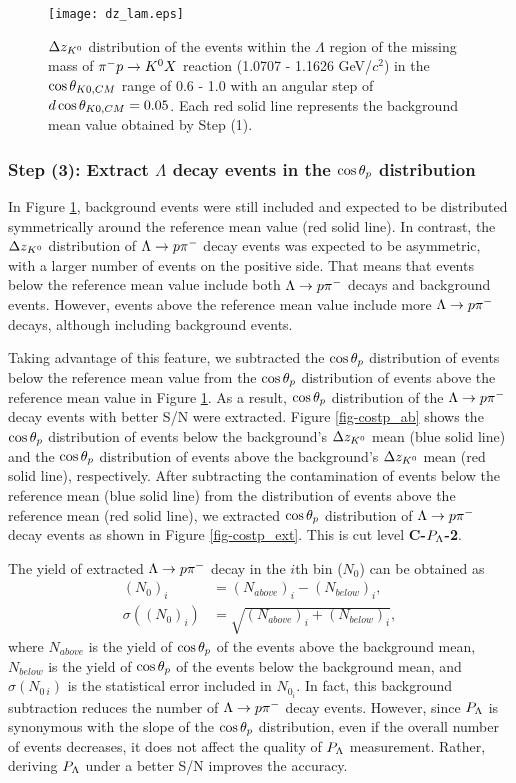 \begin{figure}[h]
  \centering
  \texttt{[image: dz\_lam.eps]}
  \caption{$\Delta z_{K^{0}}$ distribution of the events within the $\Lambda$ region of the missing mass of $\pi^- p \to K^0 X$ reaction (1.0707 - 1.1626 GeV/$c^{2}$) in the $\cos{\theta_{K0,CM}}$ range of 0.6 - 1.0 with an angular step of $d\cos{\theta_{K0,CM}}=0.05$. Each red solid line represents the background mean value obtained by Step (1).}
  \label{fig-dz_lam}
\end{figure}


\subsubsection{Step (3): Extract $\Lambda$ decay events in the $\cos{\theta_p}$ distribution}
\label{subsubsec-extcostp}

In Figure \ref{fig-dz_lam}, background events were still included and expected to be distributed symmetrically around the reference mean value (red solid line). In contrast, the $\Delta z_{K^{0}}$ distribution of $\Lambda\to p\pi^{-}$ decay events was expected to be asymmetric, with a larger number of events on the positive side. That means that events below the reference mean value include both $\Lambda\to p\pi^{-}$ decays and background events. However, events above the reference mean value include more $\Lambda\to p\pi^{-}$ decays, although including background events.

Taking advantage of this feature, we subtracted the $\cos{\theta_p}$ distribution of events below the reference mean value from the $\cos{\theta_p}$ distribution of events above the reference mean value in Figure \ref{fig-dz_lam}. As a result, $\cos{\theta_p}$ distribution of the $\Lambda\to p\pi^{-}$ decay events with better S/N were extracted. Figure \ref{fig-costp_ab} shows the $\cos{\theta_p}$ distribution of events below the background's $\Delta z_{K^{0}}$ mean (blue solid line) and the $\cos{\theta_p}$ distribution of events above the background's $\Delta z_{K^{0}}$ mean (red solid line), respectively. After subtracting the contamination of events below the reference mean (blue solid line) from the distribution of events above the reference mean (red solid line), we extracted $\cos{\theta_p}$ distribution of $\Lambda\to p\pi^{-}$ decay events as shown in Figure \ref{fig-costp_ext}. This is cut level {\bf C-$P_{\Lambda}$-2}.

The yield of extracted $\Lambda\to p\pi^{-}$ decay in the $i$th bin ($N_0$) can be obtained as
\begin{align}
  (N_{0})_i &= (N_{above})_i - (N_{below})_i, \\
  \sigma((N_{0})_i) &= \sqrt{(N_{above})_i + (N_{below})_i},
\end{align}
where $N_{above}$ is the yield of $\cos{\theta_p}$ of the events above the background mean, $N_{below}$ is the yield of $\cos{\theta_p}$ of the events below the background mean, and $\sigma(N_{0\ i})$ is the statistical error included in $N_{0_i}$. In fact, this background subtraction reduces the number of $\Lambda\to p\pi^{-}$ decay events. However, since $P_{\Lambda}$ is synonymous with the slope of the $\cos{\theta_p}$ distribution, even if the overall number of events decreases, it does not affect the quality of $P_{\Lambda}$ measurement. Rather, deriving $P_{\Lambda}$ under a better S/N improves the accuracy.

